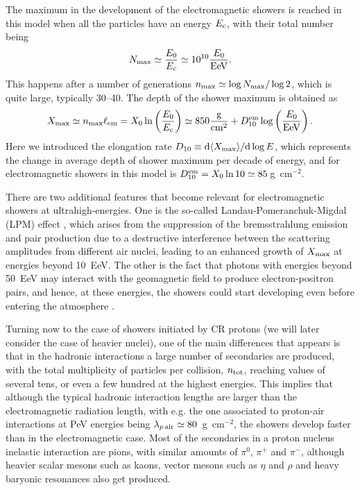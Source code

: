 \documentclass[twoside,12pt]{article}
\newcommand{\be}{\begin{equation}}
\newcommand{\ee}{\end{equation}}
\begin{document}
The maximum in the development of the electromagnetic showers is reached in this model when all the particles have an energy $E_{\rm c}$, with their total number being 
\be N_{\rm max}\simeq \frac{E_0}{E_{\rm c}}\simeq 10^{10}\frac{E_0}{\rm EeV}.
\ee
This happens after a number of generations $n_{\rm max}\simeq \log N_{\rm max}/\log 2$, which is quite large, typically 30--40. The depth of the shower maximum is obtained as
\be
X_{\rm max}\simeq n_{\rm max}\ell_{\rm em}=X_0\ln \left(\frac{E_0}{E_{\rm c}}\right)\simeq 850\frac{\rm g}{\rm cm^2}+D_{10}^{\rm em}\log\left(\frac{E_0}{\rm EeV}\right).
\ee
Here we introduced the elongation rate $D_{10}\equiv {\rm d}\langle X_{\rm max}\rangle /{\rm d} \log E$, which represents the change in average depth of shower maximum per decade of energy, and for electromagnetic showers in this model is $D_{10}^{\rm em}=X_0\ln 10\simeq 85$\,g~cm$^{-2}$. 

There are two additional features that become relevant for electromagnetic showers at ultrahigh-energies. One is  the so-called Landau-Pomeranchuk-Migdal (LPM) effect \cite{lpm}, which arises from the suppression of the bremsstrahlung emission and pair production due to a destructive interference between the  scattering amplitudes from  different air nuclei, leading to an  enhanced growth of $X_{\rm max}$ at energies beyond 10~EeV. The other is the fact that photons with energies beyond 50~EeV may interact with the geomagnetic field to produce electron-positron pairs, and hence, at these energies, the showers could start developing even before entering the atmosphere \cite{preshower}.  

Turning now to the case of showers initiated by CR protons (we will later consider the case of heavier nuclei), one of the main differences that appears is that in the hadronic interactions a large number of secondaries are produced, with the total multiplicity of particles per collision, $n_{\rm tot}$, reaching values of several tens, or even a few hundred at the highest energies. This implies that although the typical hadronic interaction lengths are larger than the electromagnetic radiation length, with e.g. the one associated to proton-air interactions at PeV energies being $\lambda_{p\,{\rm air}}\simeq 80$~g~cm$^{-2}$, the showers develop faster than in the electromagnetic case. Most of the secondaries in a proton nucleus inelastic interaction are pions, with similar amounts of $\pi^0$,  $\pi^+$ and  $\pi^-$, although heavier scalar mesons such as kaons, vector mesons such as $\eta$ and $\rho$ and heavy baryonic resonances also get produced.  
\end{document}

